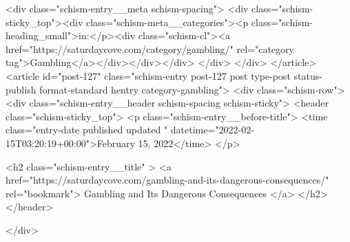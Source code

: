 {		<div class="schism-entry__meta schism-spacing">			<div class="schism-sticky_top"><div class="schism-meta__categories"><p class="schism-heading_small">in:</p><div class="schism-cl"><a href="https://saturdaycove.com/category/gambling/" rel="category tag">Gambling</a></div></div></div>		</div>
	</div>
</article>
<article id="post-127" class="schism-entry post-127 post type-post status-publish format-standard hentry category-gambling">
	<div class="schism-row">		<div class="schism-entry__header schism-spacing schism-sticky">			<header class="schism-sticky_top">				<p class="schism-entry__before-title">
					<time class="entry-date published updated " datetime="2022-02-15T03:20:19+00:00">February 15, 2022</time>				</p>

				<h2 class="schism-entry__title" >
					<a href="https://saturdaycove.com/gambling-and-its-dangerous-consequences/" rel="bookmark">
						Gambling and Its Dangerous Consequences					</a>
				</h2>
			</header>

					</div>

}
